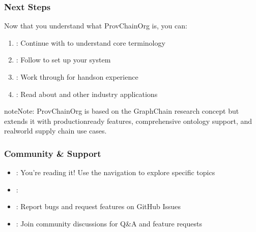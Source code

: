\documentclass[letterpaper,10pt,english]{sphinxmanual}
\begin{document}
\subsubsection{Next Steps}
\label{\detokenize{user-guide/introduction:next-steps}}
\sphinxAtStartPar
Now that you understand what ProvChainOrg is, you can:
\begin{enumerate}
%
\item {} 
\sphinxAtStartPar
{}: Continue with  to understand core terminology

\item {} 
\sphinxAtStartPar
{}: Follow  to set up your system

\item {} 
\sphinxAtStartPar
{}: Work through {\hyperref[\detokenize{user-guide/first-steps::doc}]{}} for hands\sphinxhyphen{}on experience

\item {} 
\sphinxAtStartPar
{}: Read about  and other industry applications

\end{enumerate}

\begin{sphinxadmonition}{note}{Note:}
\sphinxAtStartPar
ProvChainOrg is based on the GraphChain research concept but extends it with production\sphinxhyphen{}ready features, comprehensive ontology support, and real\sphinxhyphen{}world supply chain use cases.
\end{sphinxadmonition}


\subsubsection{Community \& Support}
\label{\detokenize{user-guide/introduction:community-support}}\begin{itemize}
\item {} 
\sphinxAtStartPar
{}: You’re reading it! Use the navigation to explore specific topics

\item {} 
\sphinxAtStartPar
{}: 

\item {} 
\sphinxAtStartPar
{}: Report bugs and request features on GitHub Issues

\item {} 
\sphinxAtStartPar
{}: Join community discussions for Q\&A and feature requests

\end{itemize}
\end{document}
